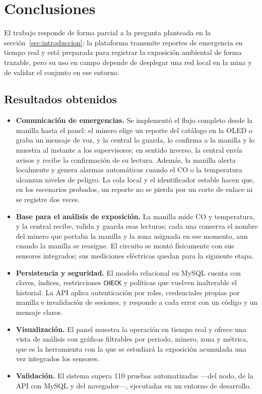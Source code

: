 \documentclass[10pt,a4paper]{article}
\newcommand{\code}[1]{{\small\urlstyle{tt}\nolinkurl{#1}}}
\newcommand{\newsection}[1]{\clearpage\section{#1}}
\begin{document}
\newsection{Conclusiones}
\label{sec:conclusiones}
El trabajo responde de forma parcial a la pregunta planteada en la sección~\ref{sec:introduccion}: la plataforma transmite reportes de emergencia en tiempo real y está preparada para registrar la exposición ambiental de forma trazable, pero su uso en campo depende de desplegar una red local en la mina y de validar el conjunto en ese entorno.

\subsection{Resultados obtenidos}
\begin{itemize}
\item \textbf{Comunicación de emergencias.} Se implementó el flujo completo desde la manilla hasta el panel: el minero elige un reporte del catálogo en la OLED o graba un mensaje de voz, y la central lo guarda, lo confirma a la manilla y lo muestra al instante a los supervisores; en sentido inverso, la central envía avisos y recibe la confirmación de su lectura. Además, la manilla alerta localmente y genera alarmas automáticas cuando el CO o la temperatura alcanzan niveles de peligro. La cola local y el identificador estable hacen que, en los escenarios probados, un reporte no se pierda por un corte de enlace ni se registre dos veces.
\item \textbf{Base para el análisis de exposición.} La manilla mide CO y temperatura, y la central recibe, valida y guarda esas lecturas; cada una conserva el nombre del minero que portaba la manilla y la zona asignada en ese momento, aun cuando la manilla se reasigne. El circuito se montó físicamente con sus sensores integrados; sus mediciones eléctricas quedan para la siguiente etapa.
\item \textbf{Persistencia y seguridad.} El modelo relacional en MySQL cuenta con claves, índices, restricciones \code{CHECK} y políticas que vuelven inalterable el historial. La API aplica autenticación por roles, credenciales propias por manilla e invalidación de sesiones, y responde a cada error con un código y un mensaje claros.
\item \textbf{Visualización.} El panel muestra la operación en tiempo real y ofrece una vista de análisis con gráficas filtrables por periodo, minero, zona y métrica, que es la herramienta con la que se estudiará la exposición acumulada una vez integrados los sensores.
\item \textbf{Validación.} El sistema supera 110 pruebas automatizadas —del nodo, de la API con MySQL y del navegador—, ejecutadas en un entorno de desarrollo.
\end{itemize}
\end{document}
